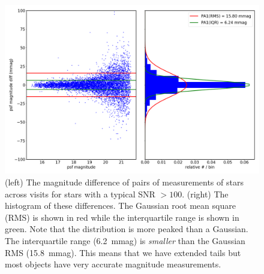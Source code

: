\documentclass[\docopts]{\docclass}
\begin{document}
\begin{figure}
\centering
\includegraphics[width=0.9\columnwidth]{DC1-imsim-dithered_r_PA1.png}
\caption{(left) The magnitude difference of pairs of measurements of stars across visits for stars with a typical SNR $>100$.  (right) The histogram of these differences.  The Gaussian root mean square (RMS) is shown in red while the interquartile range is shown in green. Note that the distribution is more peaked than a Gaussian. The interquartile range (6.2~mmag) is {\em smaller} than the Gaussian RMS (15.8~mmag). This means that we have extended tails but most objects have very accurate magnitude measurements.}
\label{fig:validate_drp_PA1}
\end{figure}

\end{document}
